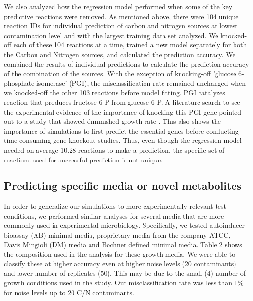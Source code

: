 \documentclass[12pt]{article}
\begin{document}
We also analyzed how the regression model performed when some of the key predictive reactions were removed. As mentioned above, there were 104 unique reaction IDs for individual prediction of carbon and nitrogen sources at lowest contamination level and with the largest training data set analyzed. We knocked-off each of these 104 reactions at a time, trained a new model separately for both the Carbon and Nitrogen sources, and calculated the prediction accuracy. We combined the results of individual predictions to calculate the prediction accuracy of the combination of the sources. With the exception of knocking-off 'glucose 6-phosphate isomerase' (PGI), the misclassification rate remained unchanged when we knocked-off the other 103 reactions before model fitting. PGI catalyzes reaction that produces fructose-6-P from glucose-6-P. A literature search to see the experimental evidence of the importance of knocking this PGI gene pointed out to a study that showed diminished growth rate \cite{Canonacoetal2001}. This also shows the importance of simulations to first predict the essential genes before conducting time consuming gene knockout studies. Thus, even though the regression model needed on average 10.28 reactions to make a prediction, the specific set of reactions used for successful prediction is not unique.


\subsection*{Predicting specific media or novel metabolites}

In order to generalize our simulations to more experimentally relevant test conditions, we performed similar analyses for several media that are more commonly used in experimental microbiology. Specifically, we tested autoinducer bioassay (AB) minimal media, proprietary media from the company ATCC, Davis Mingioli (DM) media and Bochner defined minimal media. Table 2 shows the composition used in the analysis for these growth media. We were able to classify these at higher accuracy even at higher noise levels (20 contaminants) and lower number of replicates (50). This may be due to the small (4) number of growth conditions used in the study. Our misclassification rate was less than 1\% for noise levels up to 20 C/N contaminants.
\end{document}
